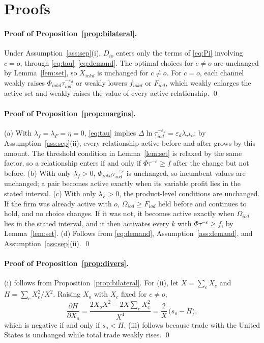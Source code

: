 \documentclass[12pt]{article}
\theoremstyle{remark}
\begin{document}
\appendix
\section{Proofs}
\label{app:proofs}

\paragraph{Proof of Proposition~\ref{prop:bilateral}.} Under
Assumption~\ref{ass:sep}(i), $D_{io}$ enters only the terms of \eqref{eq:Pi}
involving $c=o$, through \eqref{eq:tau}--\eqref{eq:demand}. The optimal
choices for $c\neq o$ are unchanged by Lemma~\ref{lem:set}, so
$X_{ickd}$ is unchanged for $c\neq o$. For $c=o$, each channel weakly raises
$\Phi_{iokd}\tau_{iod}^{-\varepsilon_d}$ or weakly lowers $f_{iokd}$ or
$F_{iod}$, which weakly enlarges the active set and weakly raises the value of
every active relationship. \qed

\paragraph{Proof of Proposition~\ref{prop:margins}.} (a) With
$\lambda_f=\lambda_F=\eta=0$, \eqref{eq:tau} implies
$\Delta\ln\tau_{iod}^{-\varepsilon_d}=\varepsilon_d\lambda_\tau\iota_o$; by
Assumption~\ref{ass:sep}(ii), every relationship active before and after grows
by this amount. The threshold condition in Lemma~\ref{lem:set} is relaxed by
the same factor, so a relationship enters if and only if
$\Phi\tau^{-\varepsilon}\geq f$ after the change but not before.
(b) With only $\lambda_f>0$, $\Phi_{iokd}\tau_{iod}^{-\varepsilon_d}$ is
unchanged, so incumbent values are unchanged; a pair becomes active exactly
when its variable profit lies in the stated interval. (c) With only
$\lambda_F>0$, the product-level conditions are unchanged. If the firm was
already active with $o$, $\Omega_{iod}\geq F_{iod}$ held before and continues
to hold, and no choice changes. If it was not, it becomes active exactly when
$\Omega_{iod}$ lies in the stated interval, and it then activates every $k$
with $\Phi\tau^{-\varepsilon}\geq f$, by Lemma~\ref{lem:set}. (d) Follows from
\eqref{eq:demand}, Assumption~\ref{ass:demand}, and Assumption~\ref{ass:sep}(ii).
\qed

\paragraph{Proof of Proposition~\ref{prop:divers}.} (i) follows from
Proposition~\ref{prop:bilateral}. For (ii), let $X=\sum_c X_c$ and
$H=\sum_c X_c^2/X^2$. Raising $X_o$ with $X_c$ fixed for $c\neq o$,
\[
\frac{\partial H}{\partial X_o}=\frac{2X_oX^2-2X\sum_cX_c^2}{X^4}
=\frac{2}{X}\,\big(s_o-H\big),
\]
which is negative if and only if $s_o<H$. (iii) follows because trade with the
United States is unchanged while total trade weakly rises. \qed
\end{document}

